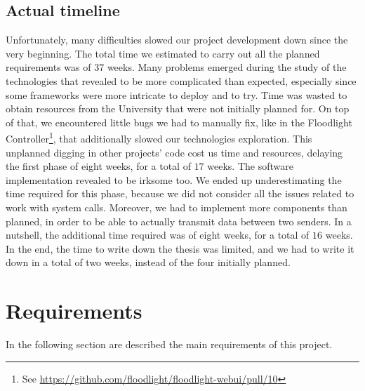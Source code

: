 \subsection{Actual timeline}
Unfortunately, many difficulties slowed our project development down since the
very beginning. The total time we estimated to carry out all the planned
requirements was of $37$ weeks. Many problems emerged
during the study of the technologies that revealed to be more complicated than
expected, especially since some frameworks were more intricate to deploy and to
try. Time was wasted to obtain resources from the University that were
not initially planned for. On top of that, we encountered little bugs we had to
manually fix, like in the Floodlight
Controller\footnote{
See \url{https://github.com/floodlight/floodlight-webui/pull/10}},
that additionally slowed our technologies exploration. This unplanned digging
in other projects' code cost us time and resources, delaying the first phase of
eight
weeks, for a total of $17$ weeks. The software implementation revealed to be
irksome too. We ended up underestimating the time required for this phase,
because
we did not consider all the issues related to work with system calls. Moreover,
we had to implement more components than planned, in order to be able to
actually transmit data between two senders. In a nutshell, the additional time
required was of eight weeks, for a total of $16$ weeks. In the end, the time to
write
down the thesis was limited, and we had to write it down in a
total of two weeks, instead of the four initially planned.

\section{Requirements}\label{chap:prjan:sec:req}
In the following section are described the main requirements of this project.

